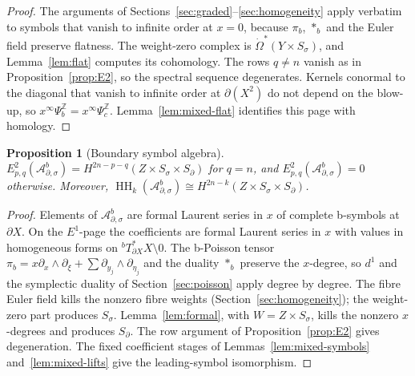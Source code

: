 \documentclass[11pt,oneside,reqno]{article}
\DeclareMathOperator{\HH}{HH}
\newcommand{\Z}{\mathbb Z}
\newcommand{\Adsb}{\mathcal A^b_{\partial,\sigma}}
\theoremstyle{plain}
\newtheorem{proposition}[theorem]{Proposition}
\theoremstyle{definition}
\theoremstyle{remark}
\begin{document}
\begin{proof}
The arguments of Sections~\ref{sec:graded}--\ref{sec:homogeneity} apply
verbatim to symbols that vanish to infinite order at \(x=0\), because
\(\pi_b\), \(*_b\) and the Euler field preserve flatness. The weight-zero
complex is \(\dot\Omega^*(Y\times S_\sigma)\), and Lemma~\ref{lem:flat}
computes its cohomology. The rows \(q\neq n\) vanish as in
Proposition~\ref{prop:E2}, so the spectral sequence degenerates. Kernels
conormal to the diagonal that vanish to infinite order at \(\partial(X^2)\)
do not depend on the blow-up, so \(x^\infty\Psi_b^{\Z}=x^\infty\Psi_c^{\Z}\).
Lemma~\ref{lem:mixed-flat} identifies this page with homology.
\end{proof}

\begin{proposition}[Boundary symbol algebra]\label{prop:Ads}
\(E^2_{p,q}(\Adsb)=H^{2n-p-q}(Z\times S_\sigma\times S_\partial)\) for
\(q=n\), and \(E^2_{p,q}(\Adsb)=0\) otherwise. Moreover,
\(\HH_k(\Adsb)\cong H^{2n-k}(Z\times S_\sigma\times S_\partial)\).
\end{proposition}

\begin{proof}
Elements of \(\Adsb\) are formal Laurent series in \(x\) of complete b-symbols
at \(\partial X\). On the \(E^1\)-page the coefficients are formal Laurent
series in \(x\) with values in homogeneous forms on
\({}^bT^*_{\partial X}X\setminus0\). The b-Poisson tensor
\(\pi_b=x\partial_x\wedge\partial_\xi+\sum\partial_{y_j}\wedge\partial_{\eta_j}\)
and the duality \(*_b\) preserve the \(x\)-degree, so \(d^1\) and the
symplectic duality of Section~\ref{sec:poisson} apply degree by degree.
The fibre Euler field kills the nonzero fibre weights
(Section~\ref{sec:homogeneity}); the weight-zero part produces
\(S_\sigma\). Lemma~\ref{lem:formal}, with \(W=Z\times S_\sigma\), kills
the nonzero \(x\)-degrees and produces \(S_\partial\). The row argument of
Proposition~\ref{prop:E2} gives degeneration.
The fixed coefficient stages of Lemmas~\ref{lem:mixed-symbols}
and~\ref{lem:mixed-lifts} give the leading-symbol isomorphism.
\end{proof}
\end{document}
